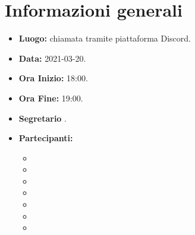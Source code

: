 \section{Informazioni generali}
	\begin{itemize}
		\item \textbf{Luogo:} chiamata tramite piattaforma Discord.
		\item \textbf{Data:} 2021-03-20.
		\item \textbf{Ora Inizio:} 18:00.
		\item \textbf{Ora Fine:} 19:00.
		\item \textbf{Segretario} \VAS.
		\item \textbf{Partecipanti:}
		\begin{itemize}
			\item \MB
			\item \VAS
			\item \FD
			\item \NM
			\item \SB
			\item \GB
			\item \MDI
		\end{itemize}
		
	\end{itemize}